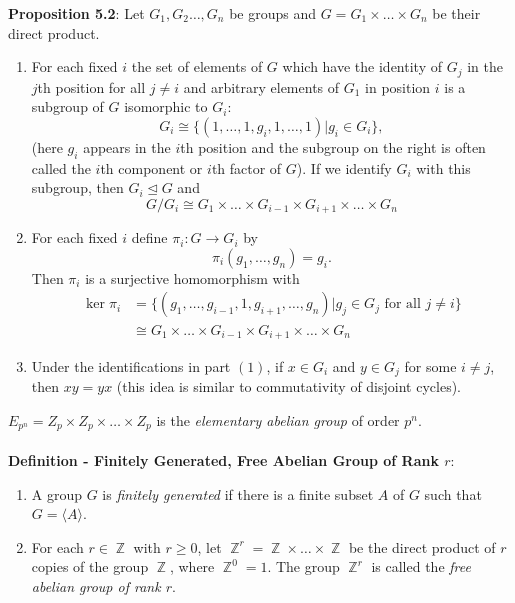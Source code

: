 \documentclass{article}
\DeclareMathOperator{\Z}{\mathbb{Z}}
\begin{document}
\textbf{Proposition 5.2}: Let $G_1, G_2 \dots, G_n$ be groups and $G = G_1 \times \dots \times G_n$ be their direct product. \begin{enumerate}
    \item For each fixed $i$ the set of elements of $G$ which have the identity of $G_j$ in the $j$th position for all $j \neq i$ and arbitrary elements of $G_1$ in position $i$ is a subgroup of $G$ isomorphic to $G_i$: $$G_i \cong \{(1, \dots, 1, g_i, 1, \dots, 1) | g_i \in G_i\},$$ (here $g_i$ appears in the $i$th position and the subgroup on the right is often called the $i$th component or $i$th factor of $G$). If we identify $G_i$ with this subgroup, then $G_i \trianglelefteq G$ and $$G/G_i \cong G_1 \times \dots \times G_{i - 1} \times G_{i + 1} \times \dots \times G_n$$
    \item For each fixed $i$ define $\pi_i: G \rightarrow G_i$ by $$\pi_i(g_1, \dots, g_n) = g_i.$$ Then $\pi_i$ is a surjective homomorphism with \begin{align*}
        \ker{\pi_i} &= \{(g_1, \dots, g_{i - 1}, 1, g_{i + 1}, \dots, g_n)| g_j \in G_j \text{ for all } j \neq i\} \\
        &\cong G_1 \times \dots \times G_{i - 1} \times G_{i + 1} \times \dots \times G_n
    \end{align*}
    \item Under the identifications in part $(1)$, if $x \in G_i$ and $y \in G_j$ for some $i \neq j$, then $xy = yx$ (this idea is similar to commutativity of disjoint cycles).
\end{enumerate} $ $ \\
$E_{p^n} = Z_p \times Z_p \times \dots \times Z_p$ is the \textit{elementary abelian group} of order $p^n$. \\ \\
\textbf{Definition - Finitely Generated, Free Abelian Group of Rank $r$}: \begin{enumerate}
    \item A group $G$ is \textit{finitely generated} if there is a finite subset $A$ of $G$ such that $G = \langle A \rangle$.
    \item For each $r \in \Z$ with $r \geq 0$, let $\Z^r = \Z \times \dots \times \Z$ be the direct product of $r$ copies of the group $\Z$, where $\Z^0 = 1$. The group $\Z^r$ is called the \textit{free abelian group of rank $r$}.
\end{enumerate} $ $ \\
\end{document}
